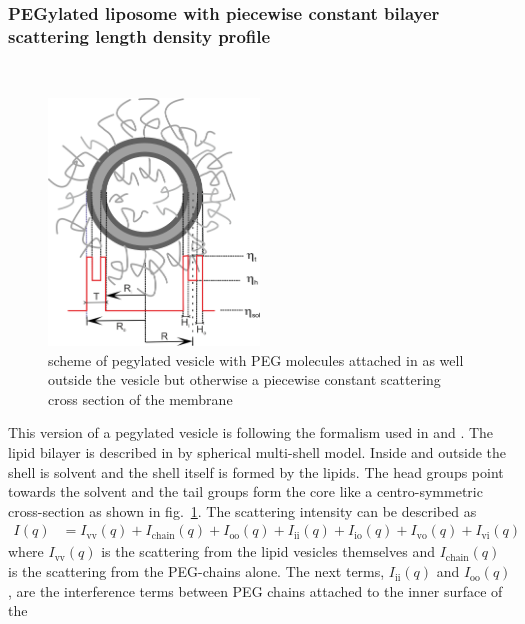 \subsubsection{PEGylated liposome with piecewise constant bilayer scattering length density profile} ~\\
\begin{figure}[htb]
\begin{center}
\includegraphics[width=0.5\textwidth]{../images/form_factor/vesicles/vesiclePEGpiecewconst.png}
\end{center}
\caption{scheme of pegylated vesicle with PEG molecules attached in as well outside the vesicle but otherwise a piecewise constant scattering cross section of the membrane}
\label{fig:vesiclePEGpiecewconst}
\end{figure}
This version of a pegylated vesicle is following the formalism used in \cite{Arleth2010} and \cite{Nielsen2018}. The lipid bilayer is described in by spherical multi-shell model. Inside and outside the shell is solvent and the shell itself is formed by the lipids. The head groups point towards the solvent and the tail groups form the core like a centro-symmetric cross-section as shown in fig.\ \ref{fig:vesiclePEGpiecewconst}. The scattering intensity can be described as
\begin{align}\label{eq:vesicePEGsphsh}
  I(q) &= I_\mathrm{vv}(q) + I_\mathrm{chain}(q) + I_\mathrm{oo}(q) + I_\mathrm{ii}(q) + I_\mathrm{io}(q) +  I_\mathrm{vo}(q) + I_\mathrm{vi}(q)
\end{align}
where $I_\mathrm{vv}(q)$ is the scattering from the lipid vesicles themselves and $I_\mathrm{chain}(q)$ is the scattering from the PEG-chains alone. The next terms, $I_\mathrm{ii}(q)$ and $I_\mathrm{oo}(q)$, are the interference terms
between PEG chains attached to the inner surface of the
